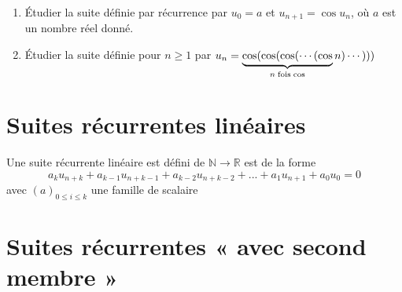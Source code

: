  \begin{exercise}
  \begin{enumerate}
   \item Étudier la suite définie par récurrence par $u_0=a$ et $ u_{n+1}= \cos u_n$, où $a$ est un nombre réel donné.
   \item Étudier la suite définie pour $ n\geqslant 1$ par $ u_n=\underbrace{\cos(\cos(\cos(\cdots(\cos}
_{n \; \rm fois\; cos} n)\cdots)))$
  \end{enumerate}
 \end{exercise}
	\section{Suites récurrentes linéaires}
  \begin{definition}
  Une suite récurrente linéaire est défini de $\mathbb{N} \longrightarrow \mathbb{R}$ est de la forme
  \[
  a_{k}u_{n+k}+ a_{k-1}u_{n+k-1} + a_{k-2}u_{n+k-2} + ...+a_{1}u_{n+1}+ a_{0}u_{0} = 0
  \]
  avec $\left(a\right)_{0\leq i \leq k}$ une famille de scalaire
  \begin{example}
  
  \end{example}
  \end{definition}
	\section{Suites récurrentes « avec second membre »}